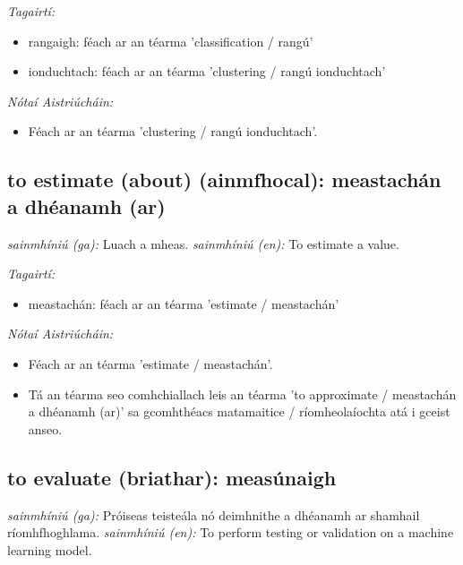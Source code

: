 \documentclass{article}
\begin{document}
 \noindent \textit{Tagairtí:}
\begin{itemize}
	\item rangaigh: féach ar an téarma 'classification / rangú'
	\item ionduchtach: féach ar an téarma 'clustering / rangú ionduchtach'
\end{itemize}

 \noindent \textit{Nótaí Aistriúcháin:}
\begin{itemize}
	\item Féach ar an téarma 'clustering / rangú ionduchtach'.
\end{itemize}


\subsection*{to estimate (about) (ainmfhocal): meastachán a dhéanamh (ar)} 
 \noindent \textit{sainmhíniú (ga):} Luach a mheas.
\newline\newline
 \noindent \textit{sainmhíniú (en):} To estimate a value.
\newline

 \noindent \textit{Tagairtí:}
\begin{itemize}
	\item meastachán: féach ar an téarma 'estimate  / meastachán'
\end{itemize}

 \noindent \textit{Nótaí Aistriúcháin:}
\begin{itemize}
	\item Féach ar an téarma 'estimate / meastachán'.
	\item Tá an téarma seo comhchiallach leis an téarma 'to approximate / meastachán a dhéanamh (ar)' sa gcomhthéacs matamaitice / ríomheolaíochta atá i gceist anseo.
\end{itemize}


\subsection*{to evaluate (briathar): measúnaigh} 
 \noindent \textit{sainmhíniú (ga):} Próiseas teisteála nó deimhnithe a dhéanamh ar shamhail ríomhfhoghlama.
\newline\newline
 \noindent \textit{sainmhíniú (en):} To perform testing or validation on a machine learning model.
\newline
\end{document}

